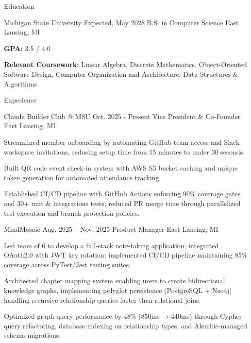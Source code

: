 \documentclass[
	11pt
]{../resume}
\begin{document}
	\begin{rSection}{E}{ducation}
		\begin{rSectionEntry}
			{Michigan State University}
			{Expected, May 2028}
			{B.S. in Computer Science}
			{}
			{East Lansing, MI}

			\item \textbf{GPA:} 3.5 / 4.0
			\item \textbf{Relevant Coursework:} Linear Algebra, Discrete Mathematics, Object-Oriented Software Design, Computer Organization and Architecture, Data Structures \& Algorithms
		\end{rSectionEntry}
	\end{rSection}

	\begin{rSection}{E}{xperience}
		\begin{rSectionEntry}
			{Claude Builder Club @ MSU}
			{Oct. 2025 - Present}
			{Vice President \& Co-Founder}
			{}
			{East Lansing, MI}

			\item Streamlined member onboarding by automating GitHub team access and Slack workspace invitations, reducing setup time from 15 minutes to under 30 seconds.
			\item Built QR code event check-in system with AWS S3 bucket caching and unique token generation for automated attendance tracking.
			\item Established CI/CD pipeline with GitHub Actions enforcing 90\% coverage gates and 30+ unit \& integrations tests; reduced PR merge time through parallelized test execution and branch protection policies.
		\end{rSectionEntry}

		\begin{rSectionEntry}
			{MindMosaic}
			{Aug. 2025 -- Nov. 2025}
			{Product Manager}
			{}
			{East Lansing, MI}

			\item Led team of 6 to develop a full-stack note-taking application; integrated OAuth2.0 with JWT key rotation; implemented CI/CD pipeline maintaining 85\% coverage across PyTest/Jest testing suites.
			\item Architected chapter mapping system enabling users to create bidirectional knowledge graphs, implementing polyglot persistence (PostgreSQL + Neo4j) handling recursive relationship queries faster than relational joins.
			\item Optimized graph query performance by 48\% (850ms → 440ms) through Cypher query refactoring, database indexing on relationship types, and Alembic-managed schema migrations.
		\end{rSectionEntry}
	\end{rSection}
\end{document}
